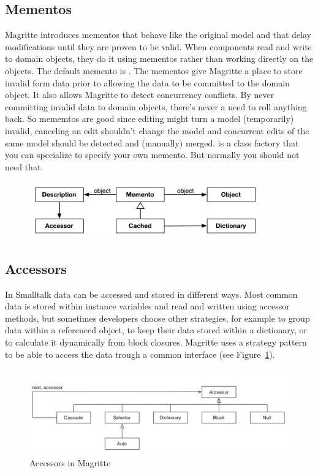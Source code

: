 \documentclass[a4paper,10pt,twoside]{book}
\begin{document}
\subsection{Mementos}
Magritte introduces mementos that behave like the original model and that delay modifications until they are proven to be valid. When components read and write to domain objects, they do it using mementos rather than working directly on  the objects. The default memento is . The mementos give Magritte a place to store invalid form data prior to allowing the data to be committed to the domain object. It also allows Magritte to detect concurrency conflicts. By never committing invalid data to domain objects, there's never a need to roll anything back. 
So mememtos are good since editing might turn a model (temporarily) invalid, canceling an edit shouldn't change the model and concurrent edits of the same model should be detected and (manually) merged.
 is a class factory that you can specialize to specify your own memento. But normally you should not need that. 



\begin{figure}[!h]
	\begin{center}
\includegraphics[width=10cm]{mementosSimpler}
 \end{center}
\end{figure}


\subsection{Accessors}
In Smalltalk data can be accessed and stored in different ways. Most common data is stored within instance variables and read and written using accessor methods, but sometimes developers choose other strategies, for example to group data within a referenced object, to keep their data stored within a dictionary, or to calculate it dynamically from block closures. Magritte uses a strategy pattern to be able to access the data trough a common interface (see Figure~\ref{fig:accessor}).


\begin{figure}[!h]
\begin{center}
\includegraphics[width=\linewidth]{accessors}
\caption{Accessors in Magritte \label{fig:accessor}}
\end{center}
\end{figure}
\end{document}
